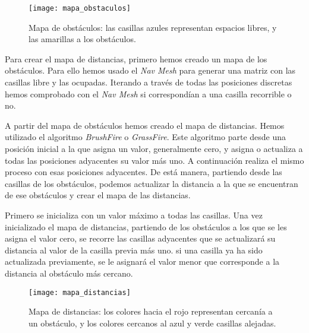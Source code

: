 \begin{figure}[htpb]
    \centering
    \texttt{[image: mapa\_obstaculos]}
    \caption[Representación del mapa de obstáculos]{Mapa de obstáculos: las casillas azules representan espacios libres, y las amarillas a los obstáculos.}
    \label{fig:basics AFM sketch}
\end{figure}

Para crear el mapa de distancias, primero hemos creado un mapa de los obstáculos. Para ello hemos usado el \textit{Nav Mesh} para generar una matriz con las casillas libre y las ocupadas. Iterando a través de todas las posiciones discretas hemos comprobado con el \textit{Nav Mesh} si correspondían a una casilla recorrible o no.

A partir del mapa de obstáculos hemos creado el mapa de distancias. Hemos utilizado el algoritmo \textit{BrushFire} o \textit{GrassFire}. Este algoritmo parte desde una posición inicial a la que asigna un valor, generalmente cero, y asigna o actualiza a todas las posiciones adyacentes su valor más uno. A continuación realiza el mismo proceso con esas posiciones adyacentes. De está manera, partiendo desde las casillas de los obstáculos, podemos actualizar la distancia a la que se encuentran de ese obstáculos y crear el mapa de las distancias.

Primero se inicializa con un valor máximo a todas las casillas. Una vez inicializado el mapa de distancias, partiendo de los obstáculos a los que se les asigna el valor cero, se recorre las casillas adyacentes que se actualizará su distancia al valor de la casilla previa más uno. si una casilla ya ha sido actualizada previamente, se le asignará el valor menor que corresponde a la distancia al obstáculo más cercano.

\begin{figure}[htpb]
    \centering
    \texttt{[image: mapa\_distancias]}
    \caption[Representación del mapa de distancias]{Mapa de distancias: los colores hacia el rojo representan cercanía a un obstáculo, y los colores cercanos al azul y verde casillas alejadas.}
    \label{fig:basics AFM sketch}
\end{figure}

